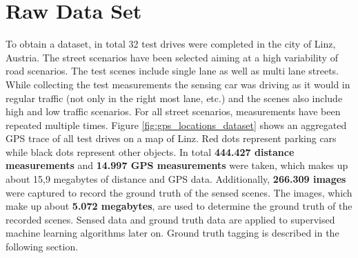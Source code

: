 \section{Raw Data Set}
\label{sec:raw_dataset}

To obtain a dataset, in total 32 test drives were completed in the city of Linz, Austria. The street scenarios have been selected aiming at a high variability of road scenarios. The test scenes include single lane as well as multi lane streets. While collecting the test measurements the sensing car was driving as it would in regular traffic (not only in the right most lane, etc.) and the scenes also include high and low traffic scenarios. For all street scenarios, measurements have been repeated multiple times.
Figure \ref{fig:gps_locations_dataset} shows an aggregated GPS trace of all test drives on a map of Linz. Red dots represent parking cars while black dots represent other objects. In total \textbf{444.427 distance measurements} and \textbf{14.997 GPS measurements} were taken, which makes up about 15,9 megabytes of distance and GPS data. 
Additionally, \textbf{266.309 images} were captured to record the ground truth of the sensed scenes. The images, which make up about \textbf{5.072 megabytes}, are used to determine the ground truth of the recorded scenes. Sensed data and ground truth data are applied to supervised machine learning algorithms later on. Ground truth tagging is described in the following section.



